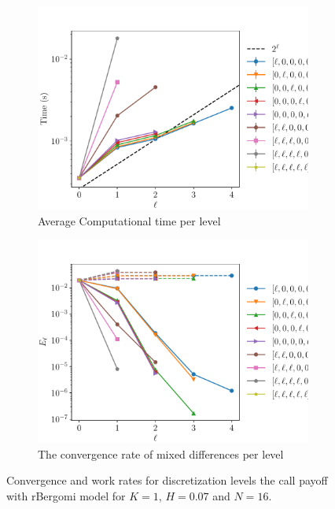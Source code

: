 \documentclass[11pt]{article}
\begin{document}
\begin{figure}[!h]
	\centering
	\begin{subfigure}{.4\textwidth}
		\centering
		\includegraphics[width=0.95\linewidth]{./figures/bergomi_misc/non_hierarchical/H_007/N_16/level_work.pdf}
		\caption{Average Computational time per level}
		\label{fig:misc_rbergomi_8_steps_sub3}
	\end{subfigure}%
	\begin{subfigure}{.4\textwidth}
		\centering
		\includegraphics[width=0.95\linewidth]{./figures/bergomi_misc/non_hierarchical/H_007/N_16/levels_error_rate.pdf}
		\caption{  The convergence rate of mixed differences per level}
		\label{fig:misc_rbergomi_8_steps_sub4}
	\end{subfigure}%
	\caption{Convergence and work rates for discretization levels  the call payoff with rBergomi model for $K=1$, $H=0.07$ and $N=16$.}
	\label{fig:misc_rbergomi_8_steps_2}
\end{figure}
\newpage
\end{document}
